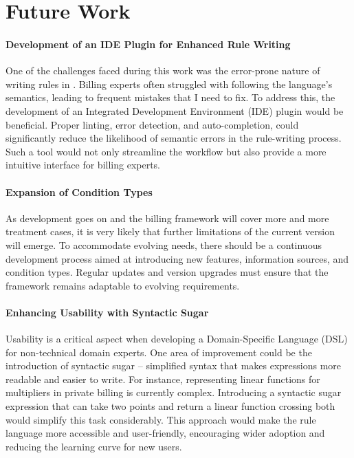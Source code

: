 \section{Future Work}\label{sec:future-work}

\paragraph{Development of an IDE Plugin for Enhanced Rule Writing}
One of the challenges faced during this work was the error-prone nature of writing rules in \RF.
Billing experts often struggled with following the language's semantics, leading to frequent mistakes that I need to fix.
To address this, the development of an Integrated Development Environment (IDE) plugin would be beneficial.
Proper linting, error detection, and  auto-completion, could significantly reduce the likelihood of semantic errors
in the rule-writing process.
Such a tool would not only streamline the workflow but also provide a more intuitive interface for billing experts.

\paragraph{Expansion of Condition Types}
As development goes on and the billing framework will cover more and more treatment cases,
it is very likely that further limitations of the current version will emerge.
To accommodate evolving needs, there should be a continuous development process aimed at introducing new features,
information sources, and condition types.
Regular updates and version upgrades must ensure that the framework remains adaptable to evolving requirements.

\paragraph{Enhancing Usability with Syntactic Sugar}
Usability is a critical aspect when developing a Domain-Specific Language (DSL) for non-technical domain experts.
One area of improvement could be the introduction of syntactic sugar –
simplified syntax that makes expressions more readable and easier to write.
For instance, representing linear functions for multipliers in private billing is currently complex.
Introducing a syntactic sugar expression that can take two points
and return a linear function crossing both would simplify this task considerably.
This approach would make the rule language more accessible and user-friendly,
encouraging wider adoption and reducing the learning curve for new users.
